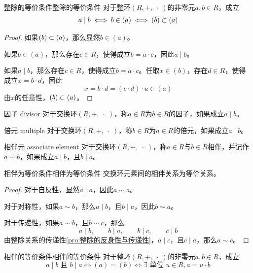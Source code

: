 \begin{lemma}{整除的等价条件}{整除的等价条件}
	对于整环$(R,+,\;\cdot\;)$的非零元$a,b\in R$，成立
	$$
	a\mid b
	\iff b\in (a)
	\iff (b)\subset (a)
	$$
\end{lemma}

\begin{proof}
	如果$(b)\subset (a)$，那么显然$b\in (a)$。
	
	如果$b\in (a)$，那么存在$c\in R$，使得成立$b=a\cdot c$，因此$a\mid b$。
	
	如果$a\mid b$，那么存在$c\in R$，使得成立$b=a\cdot c$。任取$x\in (b)$，存在$d\in R$，使得成立$x=b\cdot d$，因此
	$$
	x=b\cdot d=(c\cdot d)\cdot a\in (a)
	$$
	由$x$的任意性，$(b)\subset (a)$。
\end{proof}

\begin{definition}{因子 divisor}
	对于交换环$(R,+,\;\cdot\;)$，称$a\in R$为$b\in R$的因子，如果成立$a\mid b$。
\end{definition}

\begin{definition}{倍元 multiple}
	对于交换环$(R,+,\;\cdot\;)$，称$b\in R$为$a\in R$的倍元，如果成立$a\mid b$。
\end{definition}

\begin{definition}{相伴元 associate element}
	对于交换环$(R,+,\;\cdot\;)$，称$a\in R$与$b\in R$相伴，并记作$a\sim b$，如果成立$a\mid b$，且$b\mid a$。
\end{definition}

\begin{proposition}{相伴为等价条件}{相伴为等价条件}
	交换环元素间的相伴关系为等价关系。
\end{proposition}

\begin{proof}
	对于自反性，显然$a\mid a$，因此$a\sim a$。
	
	对于对称性，如果$a\sim b$，那么$a\mid b$，且$b\mid a$，因此$b\sim a$。
	
	对于传递性，如果$a\sim b$，且$b\sim c$，那么
	$$
	a\mid b,\qquad 
	b\mid a,\qquad 
	b\mid c,\qquad 
	c\mid b
	$$
	由整除关系的传递性\ref{pro:整除的反身性与传递性}，$a\mid c$，且$c\mid a$，那么$a\sim c$。
\end{proof}

\begin{lemma}{相伴的等价条件}{相伴的等价条件}
	对于整环$(R,+,\;\cdot\;)$的非零元$a,b\in R$，成立
	$$
	a\mid b\text{ 且 }b\mid a
	\iff (a)=(b)
	\iff 
	\exists\text{ 单位 }u\in R,a=u\cdot b
	$$
\end{lemma}

